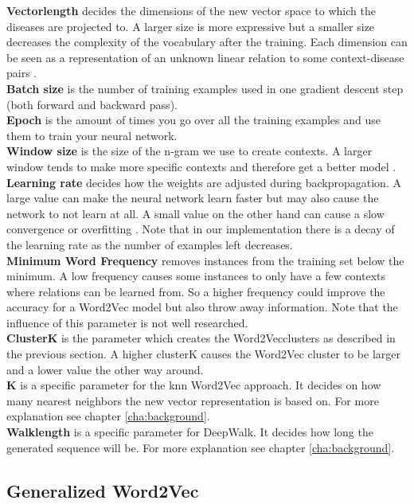 \noindent\textbf{Vectorlength} decides the dimensions of the new vector space to which the diseases are projected to. A larger size is more expressive but a smaller size decreases the complexity of the vocabulary after the training. Each dimension can be seen as a representation of an unknown linear relation to some context-disease pairs \cite{vl:article}. \\
\textbf{Batch size} is the number of training examples used in one gradient descent step (both forward and backward pass). \\
\textbf{Epoch} is the amount of times you go over all the training examples and use them to train your neural network. \\
\textbf{Window size} is the size of the n-gram we use to create contexts. A larger window tends to make more specific contexts and therefore get a better model \cite{w2vOriginal:article} \cite{windowSize:article}. \\
\textbf{Learning rate} decides how the weights are adjusted during backpropagation. A large value can make the neural network learn faster but may also cause the network to not learn at all. A small value on the other hand can cause a slow convergence or overfitting \cite{lr:article}. Note that in our implementation there is a decay of the learning rate as the number of examples left decreases. \\
\textbf{Minimum Word Frequency} removes instances from the training set below the minimum. A low frequency causes some instances to only have a few contexts where relations can be learned from. So a higher frequency could improve the accuracy for a Word2Vec model but also throw away information. Note that the influence of this parameter is not well researched. \\
\textbf{ClusterK} is the parameter which creates the Word2Vecclusters as described in the previous section. A higher clusterK causes the Word2Vec cluster to be larger and a lower value the other way around. \\
\textbf{K} is a specific parameter for the knn Word2Vec approach. It decides on how many nearest neighbors the new vector representation is based on. For more explanation see chapter \ref{cha:background}. \\
\textbf{Walklength} is a specific parameter for DeepWalk. It decides how long the generated sequence will be. For more explanation see chapter \ref{cha:background}. \\


\subsection{Generalized Word2Vec}


